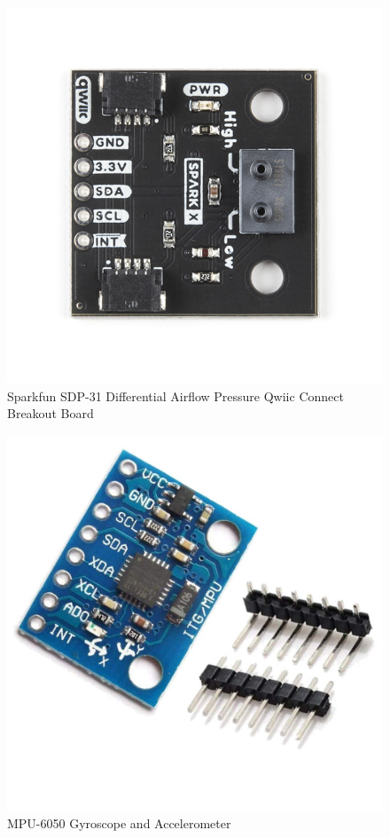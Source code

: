 \begin{center}
    \begin{figure}
        \centering
        \includegraphics{diagrams/oem/spd31.jpg}
        \caption{Sparkfun SDP-31 Differential Airflow Pressure Qwiic Connect Breakout Board}
        \label{fig:sdp-31}
    \end{figure}
\end{center}


\begin{center}
    \begin{figure}
        \centering
        \includegraphics[scale=0.2]{diagrams/oem/6050.jpg}
        \caption{MPU-6050 Gyroscope and Accelerometer}
        \label{fig:6050}
    \end{figure}
\end{center}

